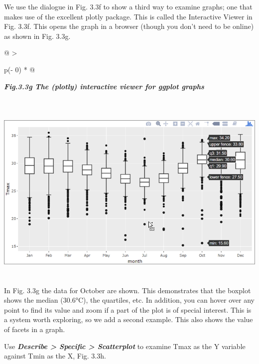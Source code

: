 \documentclass[
  letterpaper,
  DIV=11,
  numbers=noendperiod]{scrreprt}
\begin{document}
We use the dialogue in Fig. 3.3f to show a third way to examine graphs;
one that makes use of the excellent plotly package. This is called the
Interactive Viewer in Fig. 3.3f. This opens the graph in a browser
(though you don't need to be online) as shown in Fig. 3.3g.

\begin{longtable}[]{@{}
  >{\raggedright\arraybackslash}p{(\columnwidth - 0\tabcolsep) * }@{}}
\toprule\noalign{}
\begin{minipage}[b]{\linewidth}\raggedright
\textbf{\emph{Fig.3.3g The (plotly) interactive viewer for ggplot
graphs}}
\end{minipage} \\
\midrule\noalign{}
\endhead
\bottomrule\noalign{}
\endlastfoot
\includegraphics[width=6.0783in,height=3.51257in]{figures/Fig3.3g.png} \\
\end{longtable}

In Fig. 3.3g the data for October are shown. This demonstrates that the
boxplot shows the median (30.6°C), the quartiles, etc. In addition, you
can hover over any point to find its value and zoom if a part of the
plot is of special interest. This is a system worth exploring, so we add
a second example. This also shows the value of facets in a graph.

Use \textbf{\emph{Describe \textgreater{} Specific \textgreater{}
Scatterplot}} to examine Tmax as the Y variable against Tmin as the X,
Fig. 3.3h.
\end{document}
